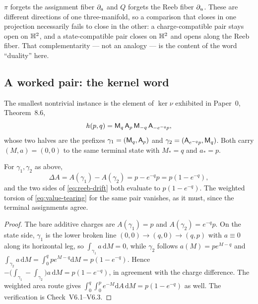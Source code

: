 \begin{remark}
\label{rem:conjugacy}
$\pi$ forgets the assignment fiber $\partial_a$ and $Q$ forgets the Reeb fiber
$\partial_u$.  These are different directions of one three-manifold, so a comparison
that closes in one projection necessarily fails to close in the other: a
charge-compatible pair stays open on $\mathbb{H}^2$, and a state-compatible pair closes
on $\mathbb{H}^2$ and opens along the Reeb fiber.  That complementarity --- not an
analogy --- is the content of the word ``duality'' here.
\end{remark}

\subsection{A worked pair: the kernel word}

The smallest nontrivial instance is the element of $\ker\nu$ exhibited in
Paper~0, Theorem~8.6,
\begin{equation}\label{eq:kernel-word}
  h(p,q)=\mathsf M_q\,\mathsf A_p\,\mathsf M_{-q}\,\mathsf A_{-e^{-q}p},
\end{equation}
whose two halves are the prefixes $\gamma_1=(\mathsf M_q,\mathsf A_p)$ and
$\gamma_2=(\mathsf A_{e^{-q}p},\mathsf M_q)$.  Both carry $(M,a)=(0,0)$ to the same terminal
state with $M_*=q$ and $a_*=p$.

\begin{lemma}
\label{lem:kernel-word}
For $\gamma_1,\gamma_2$ as above,
\[
  \Delta A=A(\gamma_1)-A(\gamma_2)=p-e^{-q}p=p(1-e^{-q}),
\]
and the two sides of \eqref{eq:reeb-drift} both evaluate to $p(1-e^{-q})$.  The
weighted torsion of \eqref{eq:value-tearing} for the same pair vanishes, as it
must, since the terminal assignments agree.
\end{lemma}

\begin{proof}
The bare additive charges are $A(\gamma_1)=p$ and $A(\gamma_2)=e^{-q}p$.  On the
state side, $\gamma_1$ is the lower broken line $(0,0)\to(q,0)\to(q,p)$ with
$a\equiv0$ along its horizontal leg, so $\int_{\gamma_1}a\,\mathrm dM=0$, while
$\gamma_2$ follows $a(M)=pe^{M-q}$ and
$\int_{\gamma_2}a\,\mathrm dM=\int_0^q pe^{M-q}\mathrm dM=p(1-e^{-q})$.
Hence $-\bigl(\int_{\gamma_1}-\int_{\gamma_2}\bigr)a\,\mathrm dM=p(1-e^{-q})$,
in agreement with the charge difference.  The weighted area route gives
$\int_0^q\!\!\int_0^p e^{-M}\mathrm dA\,\mathrm dM=p(1-e^{-q})$ as well.  The
verification is Check~V6.1--V6.3.
\end{proof}

